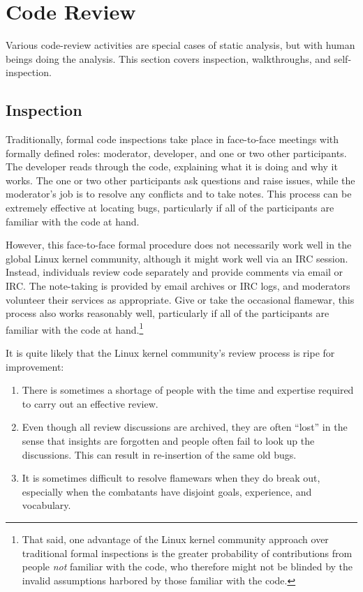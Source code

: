 \section{Code Review}
\label{sec:debugging:Code Review}

Various code-review activities are special cases of static analysis, but
with human beings doing the analysis.
This section covers inspection, walkthroughs, and self-inspection.

\subsection{Inspection}
\label{sec:debugging:Inspection}

Traditionally, formal code inspections take place in face-to-face meetings
with formally defined roles: moderator, developer, and one or two other
participants.
The developer reads through the code, explaining what it is doing and
why it works.
The one or two other participants ask questions and raise issues, while
the moderator's job is to resolve any conflicts and to take notes.
This process can be extremely effective at locating bugs, particularly
if all of the participants are familiar with the code at hand.

However, this face-to-face formal procedure does not necessarily
work well in the global Linux kernel community, although it might work
well via an IRC session.
Instead, individuals review code separately and provide comments via
email or IRC.
The note-taking is provided by email archives or IRC logs, and moderators
volunteer their services as appropriate.
Give or take the occasional flamewar, this process also works reasonably
well, particularly if all of the participants are familiar with the
code at hand.\footnote{
	That said, one advantage of the Linux kernel community approach
	over traditional formal inspections is the greater probability of
	contributions from people \emph{not} familiar with the code,
	who therefore might not be blinded by the invalid assumptions
	harbored by those familiar with the code.}

It is quite likely that the Linux kernel community's review process
is ripe for improvement:

\begin{enumerate}
\item	There is sometimes a shortage of people with the time and
	expertise required to carry out an effective review.
\item	Even though all review discussions are archived, they are
	often ``lost'' in the sense that insights are forgotten and
	people often fail to look up the discussions.
	This can result in re-insertion of the same old bugs.
\item	It is sometimes difficult to resolve flamewars when they do
	break out, especially when the combatants have disjoint
	goals, experience, and vocabulary.
\end{enumerate}

